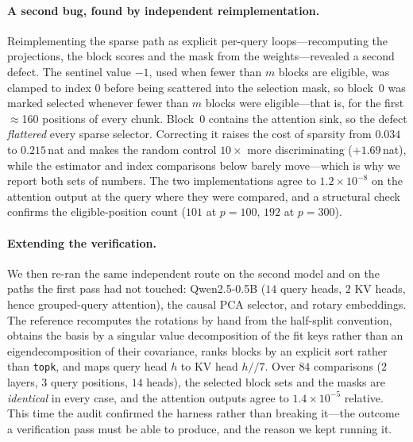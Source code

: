 \documentclass[sigconf,nonacm,11pt]{acmart}
\begin{document}
\paragraph{A second bug, found by independent reimplementation.}
Reimplementing the sparse path as explicit per-query loops---recomputing
the projections, the block scores and the mask from the weights---revealed
a second defect. The sentinel value $-1$, used when fewer than $m$ blocks
are eligible, was clamped to index $0$ before being scattered into the
selection mask, so block~$0$ was marked selected whenever fewer than $m$
blocks were eligible---that is, for the first $\approx$160 positions of
every chunk. Block~$0$ contains the attention sink, so the defect
\emph{flattered} every sparse selector. Correcting it raises the cost of
sparsity from $0.034$ to $0.215$\,nat and makes the random control
$10\times$ more discriminating ($+1.69$\,nat), while the estimator and
index comparisons below barely move---which is why we report both sets of
numbers. The two implementations agree to $1.2\times10^{-8}$ on the
attention output at the query where they were compared, and a structural
check confirms the eligible-position count ($101$ at $p=100$, $192$ at
$p=300$).

\paragraph{Extending the verification.} We then re-ran the same independent route
on the second model and on the paths the first pass had not touched: Qwen2.5-0.5B
($14$ query heads, $2$ KV heads, hence grouped-query attention), the causal PCA
selector, and rotary embeddings. The reference recomputes the rotations by hand
from the half-split convention, obtains the basis by a singular value
decomposition of the fit keys rather than an eigendecomposition of their
covariance, ranks blocks by an explicit sort rather than \texttt{topk}, and maps
query head $h$ to KV head $h//7$. Over $84$ comparisons ($2$ layers, $3$ query
positions, $14$ heads), the selected block sets and the masks are \emph{identical}
in every case, and the attention outputs agree to $1.4\times10^{-5}$ relative.
This time the audit confirmed the harness rather than breaking it---the outcome a
verification pass must be able to produce, and the reason we kept running it.
\end{document}
